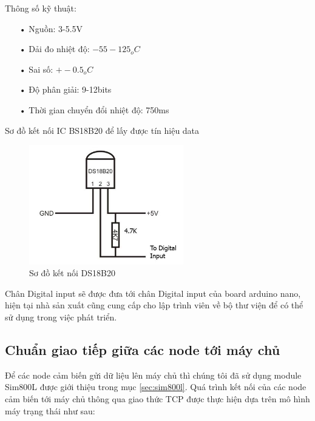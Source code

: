 Thông số kỹ thuật:
\begin{itemize}
\item[•]Nguồn: 3-5.5V
\item[•]Dải đo nhiệt độ: $-55 -125_{o}C$
\item[•]Sai số: $+-0.5_{o}C$
\item[•]Độ phân giải: 9-12bits
\item[•]Thời gian chuyển đổi nhiệt độ: 750ms
\end{itemize}
Sơ đồ kết nối IC BS18B20 để lấy được tín hiệu data
\begin{figure}[H]
	\centering    
	\includegraphics[width=0.6\textwidth]{ds18b20_ketnoi}
	\caption[Sơ đồ kết nối DS18B20]{Sơ đồ kết nối DS18B20}
	\label{fig: ds18b20_ketnoi}
\end{figure}
Chân Digital input sẽ được đưa tới chân Digital input của board arduino nano, hiện tại nhà sản xuất cũng cung cấp cho lập trình viên về bộ thư viện để có thể sử dụng trong việc phát triển.

\newpage


\subsection{Chuẩn giao tiếp giữa các node tới máy chủ}
Để các node cảm biến gửi dữ liệu lên máy chủ thì chúng tôi đã sử dụng module Sim800L được giới thiệu trong mục \ref{sec:sim800l}. Quá trình kết nối của các node cảm biến tới máy chủ thông qua giao thức TCP được thực hiện dựa trên mô hình máy trạng thái như sau:


